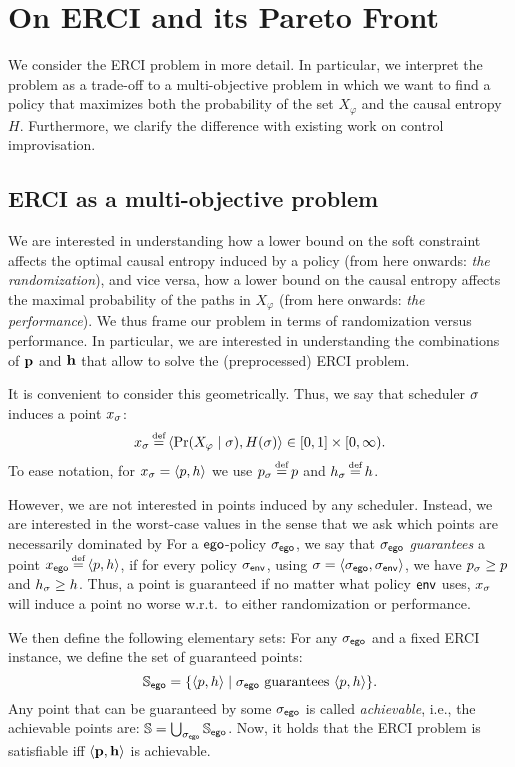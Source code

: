 
\section{On ERCI and its Pareto Front}\label{sec:convex}
We consider the ERCI problem in more detail. 
In particular, we interpret the problem as a trade-off to a multi-objective problem in which we want to find a policy that maximizes both the probability of the set $X_\varphi$ and the causal entropy $H$. 
Furthermore, we clarify the difference with existing work on control improvisation. 
\subsection{ERCI as a multi-objective problem}
We are interested in understanding how a lower bound on the soft constraint affects the optimal causal entropy induced by a policy (from here onwards: \emph{the randomization}), and vice versa, how a lower bound on the causal entropy affects the maximal probability of the paths in $X_\varphi$ (from here onwards: \emph{the performance}). We thus frame our problem in terms of randomization versus performance.
In particular, we are interested in understanding the combinations of $\mathbf{p}$ and $\mathbf{h}$ that allow to solve the (preprocessed) ERCI problem. 

It is convenient to consider this geometrically. Thus, we say that scheduler $\sigma$ induces a point $x_\sigma$: \[x_\sched \eqdef \langle \Pr(X_\varphi \mid \sched), H(\sched)  \rangle \in [0,1] \times [0,\infty).\] 
To ease notation, for $x_\sigma = \langle p,h \rangle$ we use $\scp_\sched \eqdef \scp$ and $\rndp_\sched \eqdef \rndp$.

However, we are not interested in points induced by any scheduler. Instead, we are interested in the worst-case values in the sense that we ask which points are necessarily dominated by 
For a $\mathsf{ego}$-policy ${\sigma_{\mathsf{ego}}}$, we say that ${\sigma_{\mathsf{ego}}}$ \emph{guarantees} a point $x_\pOne \eqdef \langle \scp, \rndp \rangle$, if for every policy ${\sigma_{\mathsf{env}}}$, using $\sigma = \langle {\sigma_{\mathsf{ego}}}, {\sigma_{\mathsf{env}}} \rangle$, we have $p_\sigma \geq p$ and $h_\sigma \geq h$. Thus, a point is guaranteed if no matter what policy  $\mathsf{env}$ uses, $x_\sigma$ will induce a point no worse w.r.t.\ to either randomization or performance.

We then define the following elementary sets:
For any ${\sigma_{\mathsf{ego}}}$ and a fixed ERCI instance, we define the set of guaranteed points:
  \[ \mathbb{S}_{\mathsf{ego}} = \{ \langle p, h \rangle \mid  {\sigma_{\mathsf{ego}}} \text{ guarantees } \langle p, h \rangle \}. \]
Any point that can be guaranteed by some ${\sigma_{\mathsf{ego}}}$ is called \emph{achievable}, i.e., the achievable points are:   	
 $ \mathbb{S} = \bigcup_{{\sigma_{\mathsf{ego}}}} \mathbb{S}_{\mathsf{ego}}$.
Now, it holds that the ERCI problem is satisfiable iff $\langle \mathbf{p}, \mathbf{h} \rangle$ is achievable.  


